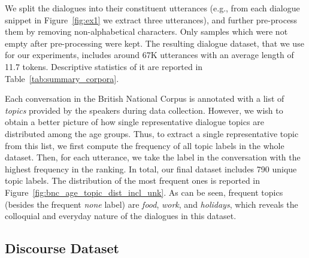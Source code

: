 We split the dialogues into their constituent utterances (e.g., from each dialogue snippet in Figure~\ref{fig:ex1} we extract three utterances), and further pre-process them by removing non-alphabetical characters.
Only samples which were not empty after pre-processing were kept.
The resulting dialogue dataset, that we use for our experiments, includes around 67K utterances with an average length of 11.7 tokens. Descriptive statistics of it are reported in Table~\ref{tab:summary_corpora}.

Each conversation in the British National Corpus is annotated with a list of \emph{topics} provided by the speakers during data collection. However, we wish to obtain a better picture of how single representative dialogue topics are distributed among the age groups.
Thus, to extract a single representative topic from this list, we first compute the frequency of all topic labels in the whole dataset. Then, for each utterance, we take the label in the conversation with the highest frequency in the ranking.
In total, our final dataset includes 790 unique topic labels. The distribution of the most frequent ones is reported in Figure~\ref{fig:bnc_age_topic_dist_incl_unk}. As can be seen, frequent topics (besides the frequent \emph{none} label) are \emph{food}, \emph{work}, and \emph{holidays}, which reveals the colloquial and everyday nature of the dialogues in this dataset.

\subsection{Discourse Dataset}


